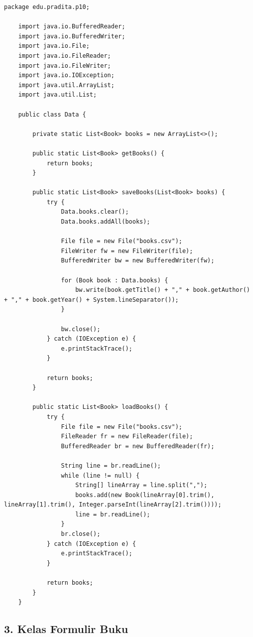 \begin{lstlisting}[style=JavaStyle]
	package edu.pradita.p10;
	
	import java.io.BufferedReader;
	import java.io.BufferedWriter;
	import java.io.File;
	import java.io.FileReader;
	import java.io.FileWriter;
	import java.io.IOException;
	import java.util.ArrayList;
	import java.util.List;
	
	public class Data {
		
		private static List<Book> books = new ArrayList<>();
		
		public static List<Book> getBooks() {
			return books;
		}
		
		public static List<Book> saveBooks(List<Book> books) {
			try {
				Data.books.clear();
				Data.books.addAll(books);
				
				File file = new File("books.csv");
				FileWriter fw = new FileWriter(file);
				BufferedWriter bw = new BufferedWriter(fw);
				
				for (Book book : Data.books) {
					bw.write(book.getTitle() + "," + book.getAuthor() + "," + book.getYear() + System.lineSeparator());
				}
				
				bw.close();
			} catch (IOException e) {
				e.printStackTrace();
			}
			
			return books;
		}
		
		public static List<Book> loadBooks() {
			try {
				File file = new File("books.csv");
				FileReader fr = new FileReader(file);
				BufferedReader br = new BufferedReader(fr);
				
				String line = br.readLine();
				while (line != null) {
					String[] lineArray = line.split(",");
					books.add(new Book(lineArray[0].trim(), lineArray[1].trim(), Integer.parseInt(lineArray[2].trim())));
					line = br.readLine();
				}
				br.close();
			} catch (IOException e) {
				e.printStackTrace();
			}
			
			return books;
		}
	}
\end{lstlisting}

\subsection{3. Kelas Formulir Buku}

